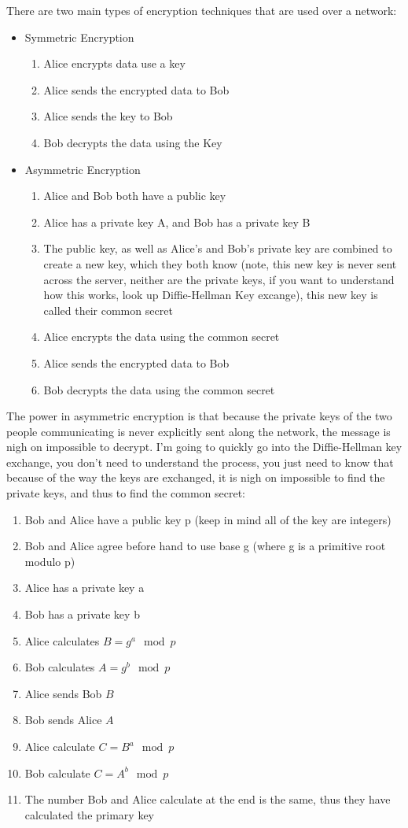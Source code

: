   There are two main types of encryption techniques that are used over a network:
  \begin{itemize}
  	\item Symmetric Encryption
  	\begin{enumerate}
  		\item Alice encrypts data use a key
  		\item Alice sends the encrypted data to Bob
  		\item Alice sends the key to Bob
  		\item Bob decrypts the data using the Key
  	\end{enumerate}
  	\item Asymmetric Encryption
  	\begin{enumerate}
  		\item Alice and Bob both have a public key
  		\item Alice has a private key A, and Bob has a private key B
  		\item The public key, as well as Alice's and Bob's private key are combined to create a new key, which they both know (note, this new key is never sent across the server, neither are the private keys, if you want to understand how this works, look up Diffie-Hellman Key excange), this new key is called their common secret
  		\item Alice encrypts the data using the common secret
  		\item Alice sends the encrypted data to Bob
  		\item Bob decrypts the data using the common secret
  	\end{enumerate}
  \end{itemize}
  The power in asymmetric encryption is that because the private keys of the two people communicating is never explicitly sent along the network, the message is nigh on impossible to decrypt. I'm going to quickly go into the Diffie-Hellman key exchange, you don't need to understand the process, you just need to know that because of the way the keys are exchanged, it is nigh on impossible to find the private keys, and thus to find the common secret:
  \begin{enumerate}
  	\item Bob and Alice have a public key p (keep in mind all of the key are integers)
  	\item Bob and Alice agree before hand to use base g (where g is a primitive root modulo p)
  	\item Alice has a private key a
  	\item Bob has a private key b
  	\item Alice calculates $B=g^a \mod p$
  	\item Bob calculates $A=g^b \mod p$
  	\item Alice sends Bob $B$
  	\item Bob sends Alice $A$
  	\item Alice calculate $C = B^a \mod p$
  	\item Bob calculate $C = A^b \mod p$
  	\item The number Bob and Alice calculate at the end is the same, thus they have calculated the primary key
  \end{enumerate}
